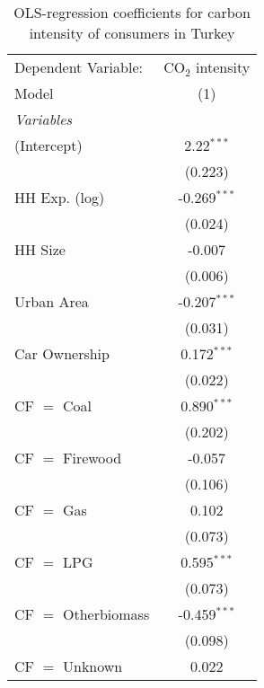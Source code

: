 
\begin{table}[htbp!]
   \centering
   \small
   \begin{adjustbox}{width = 1\textwidth, max height = 0.95\textheight, center}
      \begin{threeparttable}[b]
         \caption{\label{tab:OLS_1_TUR} OLS-regression coefficients for carbon intensity of consumers in Turkey}
         \begin{tabular}{lc}
            \tabularnewline \midrule \midrule
            Dependent Variable: & CO$_{2}$ intensity\\  
            Model               & (1)\\  
            \midrule
            \emph{Variables}\\
            (Intercept)         & 2.22$^{***}$\\   
                                & (0.223)\\   
            HH Exp. (log)       & -0.269$^{***}$\\   
                                & (0.024)\\   
            HH Size             & -0.007\\   
                                & (0.006)\\   
            Urban Area          & -0.207$^{***}$\\   
                                & (0.031)\\   
            Car Ownership       & 0.172$^{***}$\\   
                                & (0.022)\\   
            CF $=$ Coal         & 0.890$^{***}$\\   
                                & (0.202)\\   
            CF $=$ Firewood     & -0.057\\   
                                & (0.106)\\   
            CF $=$ Gas          & 0.102\\   
                                & (0.073)\\   
            CF $=$ LPG          & 0.595$^{***}$\\   
                                & (0.073)\\   
            CF $=$ Otherbiomass & -0.459$^{***}$\\   
                                & (0.098)\\   
            CF $=$ Unknown      & 0.022\\   

\end{tabular}
\end{threeparttable}
\end{adjustbox}
\end{table}
